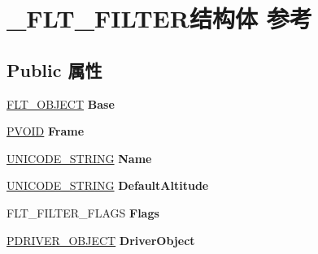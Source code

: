 \hypertarget{struct___f_l_t___f_i_l_t_e_r}{}\section{\+\_\+\+F\+L\+T\+\_\+\+F\+I\+L\+T\+E\+R结构体 参考}
\label{struct___f_l_t___f_i_l_t_e_r}
\subsection*{Public 属性}
\begin{DoxyCompactItemize}
\item 
\mbox{\label{struct___f_l_t___f_i_l_t_e_r_a327e43573d062abad6716b3e7089fa0a}} 
\hyperlink{struct___f_l_t___o_b_j_e_c_t}{F\+L\+T\+\_\+\+O\+B\+J\+E\+CT} {\bfseries Base}
\item 
\mbox{\label{struct___f_l_t___f_i_l_t_e_r_a6fac4356d9d7cbf24fab1f28efef9181}} 
\hyperlink{interfacevoid}{P\+V\+O\+ID} {\bfseries Frame}
\item 
\mbox{\label{struct___f_l_t___f_i_l_t_e_r_ad0b30d19e6398970cd21884768bc7dcf}} 
\hyperlink{struct___u_n_i_c_o_d_e___s_t_r_i_n_g}{U\+N\+I\+C\+O\+D\+E\+\_\+\+S\+T\+R\+I\+NG} {\bfseries Name}
\item 
\mbox{\label{struct___f_l_t___f_i_l_t_e_r_ae9c2a551b110527f4eb79bf7ede36bb0}} 
\hyperlink{struct___u_n_i_c_o_d_e___s_t_r_i_n_g}{U\+N\+I\+C\+O\+D\+E\+\_\+\+S\+T\+R\+I\+NG} {\bfseries Default\+Altitude}
\item 
\mbox{\label{struct___f_l_t___f_i_l_t_e_r_a5158a1786e98319667d08e17ecc26671}} 
F\+L\+T\+\_\+\+F\+I\+L\+T\+E\+R\+\_\+\+F\+L\+A\+GS {\bfseries Flags}
\item 
\mbox{\label{struct___f_l_t___f_i_l_t_e_r_aaef43527f9b2fce7856bc89a5dd6be61}} 
\hyperlink{struct___d_r_i_v_e_r___o_b_j_e_c_t}{P\+D\+R\+I\+V\+E\+R\+\_\+\+O\+B\+J\+E\+CT} {\bfseries Driver\+Object}
\item 
\mbox{\label{struct___f_l_t___f_i_l_t_e_r_a25913490fb72cc826ed7c8f4ec7d0984}} 

\end{DoxyCompactItemize}
